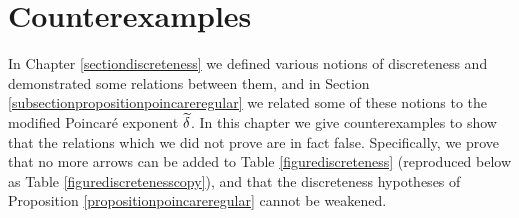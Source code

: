 %
%

\chapter{Counterexamples}\label{sectionexamples}



In Chapter \ref{sectiondiscreteness} we defined various notions of discreteness and demonstrated some relations between them, and in Section \ref{subsectionpropositionpoincareregular} we related some of these notions to the modified Poincar\'e exponent $\widetilde\delta$. In this chapter we give counterexamples to show that the relations which we did not prove are in fact false. Specifically, we prove that no more arrows can be added to Table \ref{figurediscreteness} (reproduced below as Table \ref{figurediscretenesscopy}), and that the discreteness hypotheses of Proposition \ref{propositionpoincareregular} cannot be weakened.

